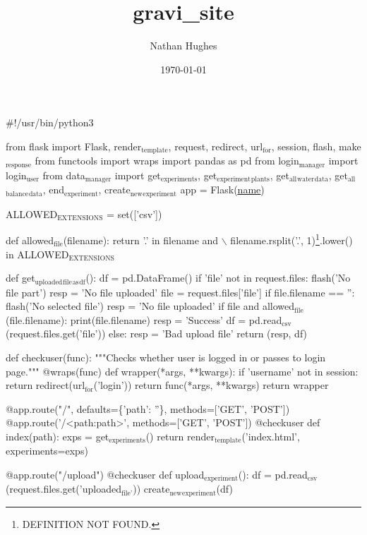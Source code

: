 \documentclass[11pt]{article}
\author{Nathan Hughes}
\date{\today}
\title{gravi\_site}
\begin{document}
\maketitle
\tableofcontents

\#!/usr/bin/python3

from flask import Flask, render$_{\text{template}}$, request, redirect, url$_{\text{for}}$, session, flash, make$_{\text{response}}$
from functools import wraps
import pandas as pd
from login$_{\text{manager}}$ import login$_{\text{user}}$
from data$_{\text{manager}}$ import get$_{\text{experiments}}$, get$_{\text{experiment}}$$_{\text{plants}}$, get$_{\text{all}}$$_{\text{water}}$$_{\text{data}}$, get$_{\text{all}}$$_{\text{balance}}$$_{\text{data}}$, end$_{\text{experiment}}$, create$_{\text{new}}$$_{\text{experiment}}$
app = Flask(\uline{\uline{name}})

ALLOWED$_{\text{EXTENSIONS}}$ = set(['csv'])


def allowed$_{\text{file}}$(filename):
    return '.' in filename and $\backslash$
           filename.rsplit('.', 1)\footnote{DEFINITION NOT FOUND.}.lower() in ALLOWED$_{\text{EXTENSIONS}}$


def get$_{\text{uploaded}}$$_{\text{file}}$$_{\text{as}}$$_{\text{df}}$():
df = pd.DataFrame()
if 'file' not in request.files:
    flash('No file part')
    resp = 'No file uploaded'
file = request.files['file']
if file.filename == '':
    flash('No selected file')
    resp = 'No file uploaded'
if file and allowed$_{\text{file}}$(file.filename):
    print(file.filename)
    resp = 'Success'
    df = pd.read$_{\text{csv}}$(request.files.get('file'))
else:
    resp = 'Bad upload file'
return (resp, df)


def checkuser(func):
    """Checks whether user is logged in or passes to login page."""
    @wraps(func)
    def wrapper(*args, **kwargs):
        if 'username' not in session:
            return redirect(url$_{\text{for}}$('login'))
        return func(*args, **kwargs)
    return wrapper


@app.route("/", defaults=\{'path': ''\}, methods=['GET', 'POST'])
@app.route('/<path:path>', methods=['GET', 'POST'])
@checkuser
def index(path):
    exps = get$_{\text{experiments}}$()
    return render$_{\text{template}}$('index.html', experiments=exps)


@app.route("/upload")
@checkuser
def upload$_{\text{experiment}}$():
    df = pd.read$_{\text{csv}}$(request.files.get('uploaded$_{\text{file'}}$))
    create$_{\text{new}}$$_{\text{experiment}}$(df)
\end{document}
